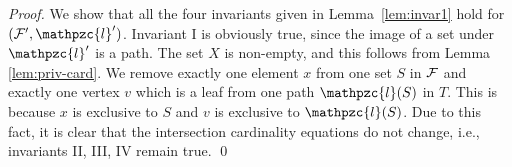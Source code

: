 \documentclass[envcountsect, envcountsame, 11pt]{../lib/llncs2e/llncs}
\def\cF{{\cal F}}
\def\cl{\mathpzc{l}}
\def\assign{\leftarrow}
\begin{document}
\begin{proof}
We show that all  the four invariants given in
  Lemma~\ref{lem:invar1} hold for $(\cF',\cl')$.
    Invariant I is obviously true, since the image of a set under $\cl'$ is a path.   The set $X$ is
  non-empty, and this follows from Lemma \ref{lem:priv-card}.   We remove exactly one element $x$ from one set $S$ in $\cF$
  and exactly one vertex $v$ which is a leaf from one path
  $\cl(S)$ in $T$. This is because $x$ is exclusive to $S$ and $v$ is
  exclusive to $\cl(S)$. Due to this fact, it is clear that the
  intersection cardinality equations do not change, i.e., invariants
  II, III, IV remain true.  \qed
\end{proof}


\noindent 
  
\end{document}
